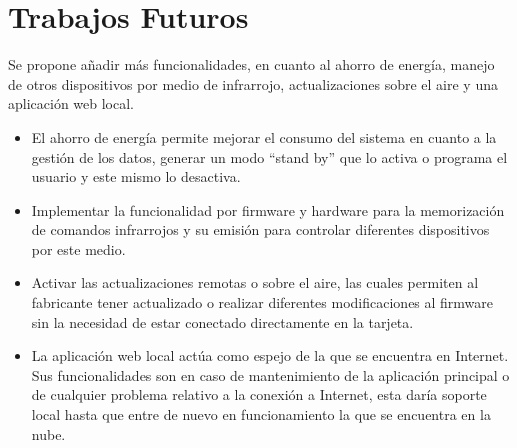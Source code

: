 \chapter{Trabajos Futuros}

Se propone añadir más funcionalidades, en cuanto al ahorro de energía, manejo de otros dispositivos por medio de infrarrojo, actualizaciones sobre el aire y una aplicación web local.

\begin{itemize}
	\item El ahorro de energía permite mejorar el consumo del sistema en cuanto a la gestión de los datos, generar un modo ``stand by'' que lo activa o programa el usuario y este mismo lo desactiva.
	\item Implementar la funcionalidad por firmware y hardware para la memorización de comandos infrarrojos y su emisión para controlar diferentes dispositivos por este medio.
	\item Activar las actualizaciones remotas o sobre el aire, las cuales permiten al fabricante tener actualizado o realizar diferentes modificaciones al firmware sin la necesidad de estar conectado directamente en la tarjeta.
	\item La aplicación web local actúa como espejo de la que se encuentra en Internet. Sus funcionalidades son en caso de mantenimiento de la aplicación principal o de cualquier problema relativo a la conexión a Internet, esta daría soporte local hasta que entre de nuevo en funcionamiento la que se encuentra en la nube.
\end{itemize}